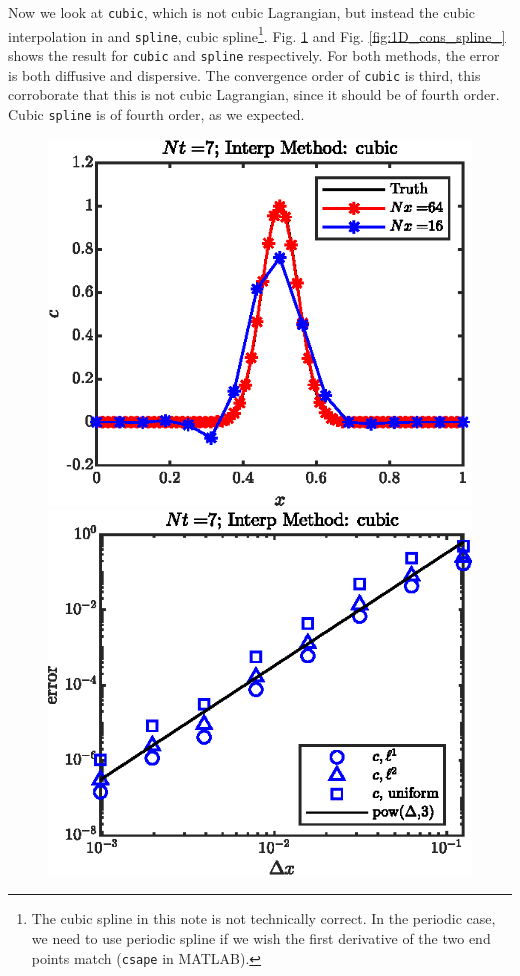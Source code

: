 \documentclass[11pt,letterpaper]{article}
\begin{document}
Now we look at \texttt{cubic}, which is not cubic Lagrangian, but instead the cubic interpolation in \cite{keys_cubic_1981} and \texttt{spline}, cubic spline\footnote{The cubic spline in this note is not technically correct. In the periodic case, we need to use periodic spline if we wish the first derivative of the two end points match (\texttt{csape} in MATLAB).}. Fig. \ref{fig:1D_cons_cubic_} and Fig. \ref{fig:1D_cons_spline_} shows the result for \texttt{cubic} and \texttt{spline} respectively. For both methods, the error is both diffusive and dispersive. The convergence order of \texttt{cubic} is third, this corroborate that this is not cubic Lagrangian, since it should be of fourth order. Cubic \texttt{spline} is of fourth order, as we expected.
\begin{figure}[H]
    \centering
    \includegraphics{figs/1D_cons_cubic_sol}
    \includegraphics{figs/1D_cons_cubic_convord}
    \caption{}\label{fig:1D_cons_cubic_}
\end{figure}
\end{document}
